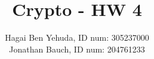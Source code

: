 \documentclass{article}
\title{Crypto - HW 4}
\author{Hagai Ben Yehuda, ID num: 305237000\\ Jonathan Bauch, ID num: 204761233}
\date{}
\begin{document}
  \maketitle

\section{} %

\section{} %

\section{} %

\section{} %

\section{} %

\section{} %

\section{} %

\section{} %

\subsection{} %

\subsection{} %
\end{document}
